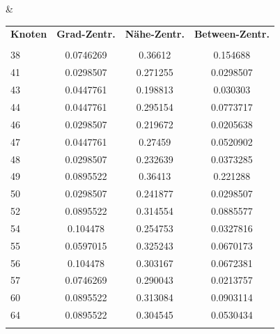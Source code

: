 \begin{table}[h!]
\begin{tabular}{lcccc}
  \\\bottomrule
 \end{tabular}
  &
\begin{tabular}{lccc}
\toprule 
\textbf{Knoten} &\textbf{Grad-Zentr.} &\textbf{Nähe-Zentr.}  &\textbf{Between-Zentr.}\\
   &\\\midrule
 38 & 0.0746269 & 0.36612  & 0.154688    \\
 41 & 0.0298507 & 0.271255 & 0.0298507   \\
 43 & 0.0447761 & 0.198813 & 0.030303    \\
 44 & 0.0447761 & 0.295154 & 0.0773717   \\
 46 & 0.0298507 & 0.219672 & 0.0205638   \\
 47 & 0.0447761 & 0.27459  & 0.0520902   \\
 48 & 0.0298507 & 0.232639 & 0.0373285   \\
 49 & 0.0895522 & 0.36413  & 0.221288    \\
 50 & 0.0298507 & 0.241877 & 0.0298507   \\
 52 & 0.0895522 & 0.314554 & 0.0885577   \\
 54 & 0.104478  & 0.254753 & 0.0327816   \\
 55 & 0.0597015 & 0.325243 & 0.0670173   \\
 56 & 0.104478  & 0.303167 & 0.0672381   \\
 57 & 0.0746269 & 0.290043 & 0.0213757   \\
 60 & 0.0895522 & 0.313084 & 0.0903114   \\
 64 & 0.0895522 & 0.304545 & 0.0530434   \\
      \\\bottomrule
\end{tabular}
\end{table}
\label{TablleSNA}

